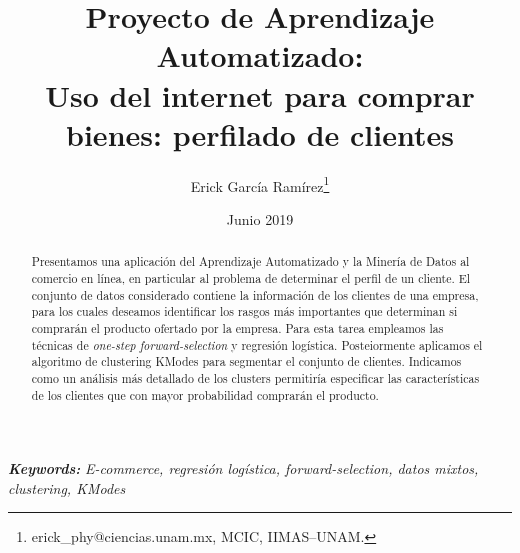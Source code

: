 \documentclass[letterpaper,11pt]{article}
\providecommand{\keywords}[1]{\textbf{\small \textit{Keywords:}} {\small\em #1}}
\begin{document}
\title{Proyecto de Aprendizaje Automatizado:\\
{\Large Uso del internet para comprar bienes: perfilado de clientes}}
\author{Erick García Ramírez\footnote{
erick\_phy@ciencias.unam.mx, MCIC, IIMAS--UNAM.}}
\date{Junio 2019}
\maketitle
\begin{abstract}
    \noindent Presentamos una aplicación del Aprendizaje Automatizado y la Minería de Datos al comercio en línea, en
    particular al problema de determinar el perfil de un cliente. El conjunto de datos considerado contiene la
    información de los clientes de una empresa, para los cuales deseamos identificar los rasgos 
    más importantes que determinan si comprarán el producto ofertado por la empresa. Para esta tarea empleamos las técnicas de
\emph{one-step forward-selection} y regresión logística.  Posteiormente aplicamos el algoritmo de clustering KModes para
segmentar el conjunto de clientes. Indicamos como un análisis más detallado de los clusters permitiría especificar 
las características de los clientes que con mayor probabilidad comprarán el producto.
\end{abstract}
\keywords{E-commerce, regresión logística, forward-selection, datos mixtos, clustering, KModes}

\vspace{\baselineskip}
\end{document}
